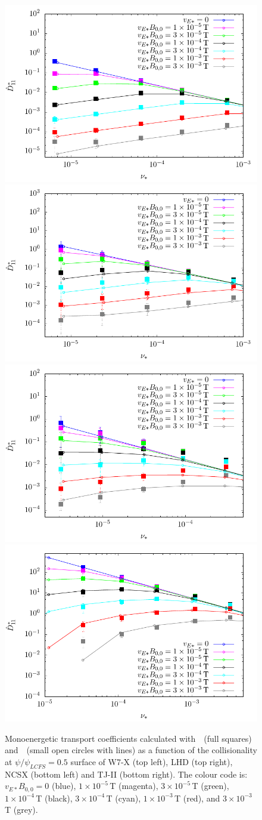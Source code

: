 \begin{figure}
\centering
\includegraphics[angle=0,width=0.45\columnwidth]{figures/d11w7x.pdf}
\includegraphics[angle=0,width=0.45\columnwidth]{figures/d11lhd.pdf}
\includegraphics[angle=0,width=0.45\columnwidth]{figures/d11ncsx.pdf}
\includegraphics[angle=0,width=0.45\columnwidth]{figures/d11tj2.pdf}
\caption{Monoenergetic transport coefficients calculated with~\DKES~(full squares) and~\KNOSOS~(small open circles with lines) as a function of the collisionality at $\psi/\psi_{LCFS}=0.5$ surface of W7-X (top left), LHD (top right), NCSX (bottom left) and TJ-II (bottom right). The colour code is: $v_{E*}B_{0,0}=0$ (blue),  $1\times 10^{-5}\,$T (magenta),  $3\times 10^{-5}\,$T (green),  $1\times 10^{-4}\,$T (black),  $3\times 10^{-4}\,$T (cyan),  $1\times 10^{-3}\,$T (red),  and $3\times 10^{-3}\,$T (grey).}
\label{FIG_D11}
\end{figure}


